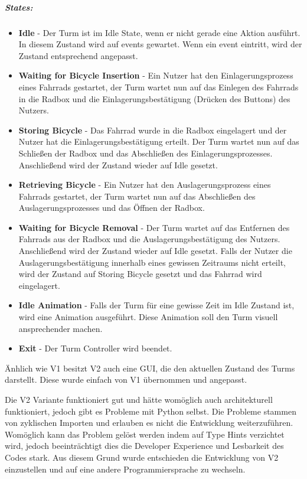 \subparagraph{States:}
\begin{itemize}
  \item \textbf{Idle} - Der Turm ist im Idle State, wenn er nicht gerade eine Aktion ausführt. In diesem Zustand wird auf \Glspl{event} gewartet. Wenn ein \Gls{event} eintritt, wird der Zustand entsprechend angepasst.
  \item \textbf{Waiting for Bicycle Insertion} - Ein Nutzer hat den Einlagerungsprozess eines Fahrrads gestartet, der Turm wartet nun auf das Einlegen des Fahrrads in die Radbox und die Einlagerungsbestätigung (Drücken des Buttons) des Nutzers.
  \item \textbf{Storing Bicycle} - Das Fahrrad wurde in die Radbox eingelagert und der Nutzer hat die Einlagerungsbestätigung erteilt. Der Turm wartet nun auf das Schließen der Radbox und das Abschließen des Einlagerungsprozesses. Anschließend wird der Zustand wieder auf Idle gesetzt.
  \item \textbf{Retrieving Bicycle} - Ein Nutzer hat den Auslagerungsprozess eines Fahrrads gestartet, der Turm wartet nun auf das Abschließen des Auslagerungsprozesses und das Öffnen der Radbox.
  \item \textbf{Waiting for Bicycle Removal} - Der Turm wartet auf das Entfernen des Fahrrads aus der Radbox und die Auslagerungsbestätigung des Nutzers. Anschließend wird der Zustand wieder auf Idle gesetzt. Falls der Nutzer die Auslagerungsbestätigung innerhalb eines gewissen Zeitraums nicht erteilt, wird der Zustand auf Storing Bicycle gesetzt und das Fahrrad wird eingelagert.
  \item \textbf{Idle Animation} - Falls der Turm für eine gewisse Zeit im Idle Zustand ist, wird eine Animation ausgeführt. Diese Animation soll den Turm visuell ansprechender machen.
  \item \textbf{Exit} - Der Turm Controller wird beendet.
\end{itemize}

Änhlich wie V1 besitzt V2 auch eine \ac{GUI}, die den aktuellen Zustand des Turms darstellt. Diese wurde einfach von V1 übernommen und angepasst.

Die V2 Variante funktioniert gut und hätte womöglich auch architekturell funktioniert, jedoch gibt es Probleme mit Python selbst. Die Probleme stammen von zyklischen Importen und erlauben es nicht die Entwicklung weiterzuführen. Womöglich kann das Problem gelöst werden indem auf Type Hints verzichtet wird, jedoch beeinträchtigt dies die Developer Experience und Lesbarkeit des Codes stark. Aus diesem Grund wurde entschieden die Entwicklung von V2 einzustellen und auf eine andere Programmiersprache zu wechseln.